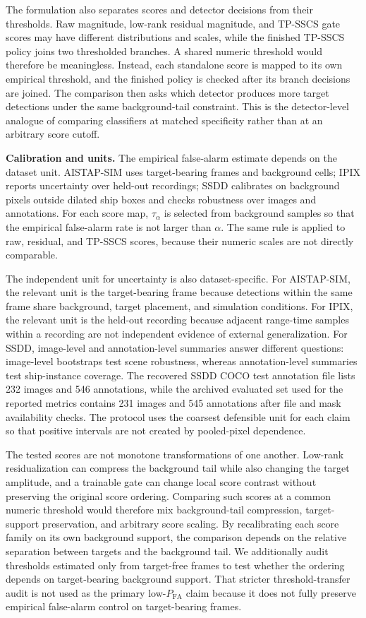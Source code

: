 \documentclass[journal]{IEEEtran}
\begin{document}
The formulation also separates scores and detector decisions from their thresholds. Raw magnitude, low-rank residual magnitude, and TP-SSCS gate scores may have different distributions and scales, while the finished TP-SSCS policy joins two thresholded branches. A shared numeric threshold would therefore be meaningless. Instead, each standalone score is mapped to its own empirical threshold, and the finished policy is checked after its branch decisions are joined. The comparison then asks which detector produces more target detections under the same background-tail constraint. This is the detector-level analogue of comparing classifiers at matched specificity rather than at an arbitrary score cutoff.

\noindent\textbf{Calibration and units.} The empirical false-alarm estimate depends on the dataset unit. AISTAP-SIM uses target-bearing frames and background cells; IPIX reports uncertainty over held-out recordings; SSDD calibrates on background pixels outside dilated ship boxes and checks robustness over images and annotations. For each score map, $\tau_\alpha$ is selected from background samples so that the empirical false-alarm rate is not larger than $\alpha$. The same rule is applied to raw, residual, and TP-SSCS scores, because their numeric scales are not directly comparable.

The independent unit for uncertainty is also dataset-specific. For AISTAP-SIM, the relevant unit is the target-bearing frame because detections within the same frame share background, target placement, and simulation conditions. For IPIX, the relevant unit is the held-out recording because adjacent range-time samples within a recording are not independent evidence of external generalization. For SSDD, image-level and annotation-level summaries answer different questions: image-level bootstraps test scene robustness, whereas annotation-level summaries test ship-instance coverage. The recovered SSDD COCO test annotation file lists 232 images and 546 annotations, while the archived evaluated set used for the reported metrics contains 231 images and 545 annotations after file and mask availability checks. The protocol uses the coarsest defensible unit for each claim so that positive intervals are not created by pooled-pixel dependence.

The tested scores are not monotone transformations of one another. Low-rank residualization can compress the background tail while also changing the target amplitude, and a trainable gate can change local score contrast without preserving the original score ordering. Comparing such scores at a common numeric threshold would therefore mix background-tail compression, target-support preservation, and arbitrary score scaling. By recalibrating each score family on its own background support, the comparison depends on the relative separation between targets and the background tail. We additionally audit thresholds estimated only from target-free frames to test whether the ordering depends on target-bearing background support. That stricter threshold-transfer audit is not used as the primary low-$P_{\mathrm{FA}}$ claim because it does not fully preserve empirical false-alarm control on target-bearing frames.
\end{document}

